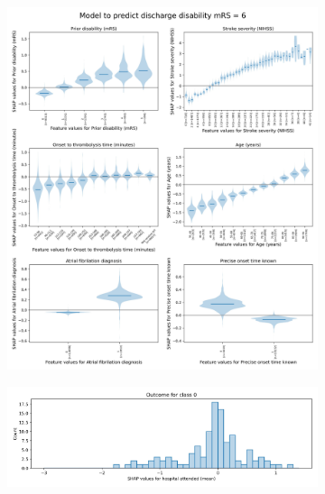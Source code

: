 \begin{figure}
\begin{subfigure}{.5\textwidth}
      \includegraphics[trim={0 0 0 1.2cm}, clip, width=0.95\linewidth]      {./images/053_xgb_7_features_1fold_thrombolysis_shap_violin_all_features_for_mRS6}\\%
    \end{subfigure}
    \hfill
    \begin{subfigure}{.5\textwidth}
      \centering
      \captionsetup{width=.9\linewidth}
      \includegraphics[trim={0 0 0 1cm}, clip, width=1\linewidth]    {./images/053_xgb_7_features_1fold_hosp_shap_hist_mrs0}\\%

\end{subfigure}
\end{figure}
